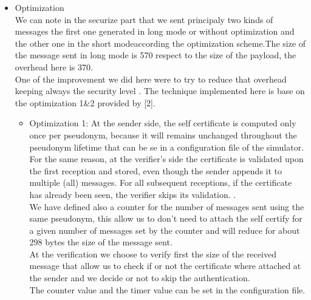 \begin{itemize}
\item Optimization\\

We can note in the securize part  that we sent principaly two kinds of messages the first one generated in long mode or without optimization and the other one in the short modeaccording the optimization scheme.The size of the message sent in long mode is 570 respect to the size of the payload, the overhead here is 370.\\
 One of the improvement we did here were to try to reduce that overhead keeping always the security level . The technique implemented  here is base on the  optimization 1\&2 provided by [2]. \\
 \begin{itemize}
 \item Optimization 1: At the sender side, the self certificate  is computed only once per pseudonym, because it will remains unchanged throughout the pseudonym lifetime that can be se in a configuration file of the simulator. For the same reason, at the verifier's side the certificate is validated upon the first reception and stored, even though the sender appends it to multiple (all) messages. For all subsequent receptions, if the certificate has already been seen, the verifier skips its validation.
 .\\
    We have defined also a  counter for the number of messages sent using the same pseudonym, this allow us to don't need to attach the self certify for a given  number of messages set by the counter and will reduce for about 298 bytes the size of the message sent.\\
   At the verification we choose to verify first the size of the received message  that allow us to check if or not the certificate where attached at the sender  and we decide or not  to skip the authentication.\\ 
The counter value and the timer value can be set  in the configuration file.
\end{itemize}
\end{itemize}


